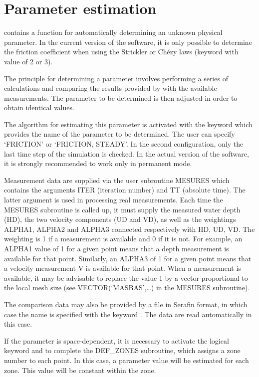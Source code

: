 \section{Parameter estimation }

  contains a function for automatically determining an unknown physical parameter. In the current version of the software, it is only possible to determine the friction coefficient when using the Strickler or Ch\'{e}zy laws (keyword  with value of 2 or 3).

 The principle for determining a parameter involves performing a series of calculations and comparing the results provided by  with the available measurements. The parameter to be determined is then adjusted in order to obtain identical values.

 The algorithm for estimating this parameter is activated with the keyword  which provides the name of the parameter to be determined. The user can specify `FRICTION' or `FRICTION, STEADY'. In the second configuration, only the last time step of the simulation is checked. In the actual version of the software, it is strongly recommended to work only in permanent mode.

 Measurement data are supplied via the user subroutine MESURES which contains the arguments ITER (iteration number) and TT (absolute time). The latter argument is used in processing real measurements. Each time the MESURES subroutine is called up, it must supply the measured water depth (HD), the two velocity components (UD and VD), as well as the weightings ALPHA1, ALPHA2 and ALPHA3 connected respectively with HD, UD, VD. The weighting is 1 if a measurement is available and 0 if it is not. For example, an ALPHA1 value of 1 for a given point means that a depth measurement is available for that point. Similarly, an ALPHA3 of 1 for a given point means that a velocity measurement V is available for that point. When a measurement is available, it may be advisable to replace the value 1 by a vector proportional to the local mesh size (see VECTOR(`MASBAS',{\dots}) in the MESURES subroutine).

 The comparison data may also be provided by a file in Serafin format, in which case the name is specified with the keyword . The data are read automatically in this case.

 If the parameter is space-dependent, it is necessary to activate the logical keyword  and to complete the DEF\_ZONES subroutine, which assigns a zone number to each point. In this case, a parameter value will be estimated for each zone. This value will be constant within the zone.

